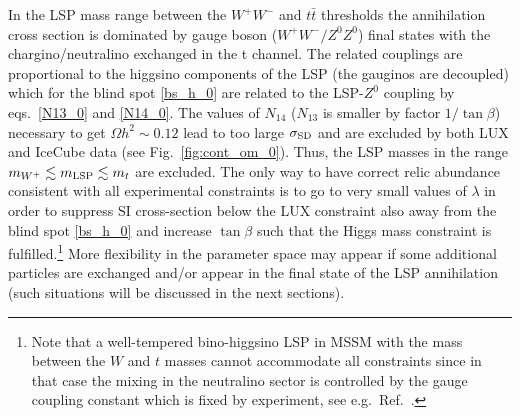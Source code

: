 \documentclass[12pt,twoside]{article}
\begin{document}
In the LSP mass range between the $W^+W^-$ and $t\bar{t}$ thresholds the 
annihilation cross section is dominated by gauge boson ($W^+W^-/Z^0Z^0$) 
final states with the chargino/neutralino exchanged in the t channel. 
The related couplings are proportional to the higgsino components of the 
LSP (the gauginos are decoupled) which for the blind spot \eqref{bs_h_0} 
are related to the LSP-$Z^0$ coupling by eqs.~\eqref{N13_0} and 
\eqref{N14_0}.
The values of $N_{14}$ ($N_{13}$ is smaller by factor $1/\tan\beta$) 
necessary to get $\Omega h^2\sim0.12$ lead to too large 
$\sigma_{\rm SD}$ and are excluded by both LUX and IceCube data
(see Fig.~\ref{fig:cont_om_0}). Thus, the LSP masses in the range 
$m_{W^+} \lesssim m_{\rm LSP} \lesssim m_{t}$ are excluded. 
The only way to have correct relic
abundance consistent with all experimental constraints is to go to very small values of $\lambda$ in order to suppress SI cross-section below the
LUX constraint also away from the blind spot \eqref{bs_h_0} and increase $\tan\beta$ such that the Higgs mass constraint is 
fulfilled.\footnote{
Note that a well-tempered bino-higgsino LSP in MSSM with the mass between the 
$W$ and $t$ masses cannot accommodate all constraints since in that
case the mixing in the neutralino sector is controlled by the gauge coupling constant which is fixed by experiment, see
e.g.~Ref.~\cite{underabundant,welltemperedBOS}.}
More flexibility in the parameter space may appear
if some additional particles are exchanged and/or appear in the final 
state of the LSP annihilation (such situations will be discussed in 
the next sections).
\end{document}
